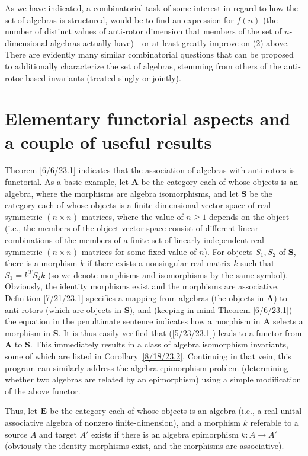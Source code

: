 \documentclass{amsart}
\numberwithin{equation}{section}
\theoremstyle{definition}
\numberwithin{theorem}{section}
\begin{document}
  \medskip
  
As we have indicated, a combinatorial task of some interest in regard to how the set of algebras is structured, would be to find an expression for $f(n)$ (the number of distinct values of anti-rotor dimension that members of the set of $n$-dimensional algebras actually have) - or at least greatly improve on (2) above.   
There are evidently many similar combinatorial questions that can be proposed to additionally characterize the set of algebras, stemming from others of the anti-rotor based invariants (treated singly or jointly).

\section{Elementary functorial aspects and a couple of useful results}
 Theorem \ref{6/6/23.1} indicates that the association of algebras with anti-rotors is functorial.  As a basic example, let {\bf A} be the category each of whose objects is an algebra, where the morphisms are algebra isomorphisms, and let {\bf S} be the category each of whose objects is a finite-dimensional vector space of real symmetric $(n\times n)$-matrices, where the value of $n\ge 1$ depends on the object (i.e., the members of the object vector space consist of different linear combinations of the members of a finite set of linearly independent real symmetric $(n\times n)$-matrices for some fixed value of $n$).  For objects $S_1,S_2$ of {\bf S}, there is a morphism $k$ if there exists a nonsingular real matrix $k$ such that \mbox{$S_1  = k^T  S_2 k$} (so we denote morphisms and isomorphisms by the same symbol).  Obviously, the identity morphisms exist and the morphisms are associative.    Definition \ref{7/21/23.1} specifies a mapping from algebras (the objects in {\bf A}) to anti-rotors (which are objects in {\bf S}), and (keeping in mind Theorem \ref{6/6/23.1}) the equation in the penultimate sentence indicates how a morphism in {\bf A} selects a morphism in {\bf S}.  It is thus easily verified that (\ref{5/23/23.1}) leads to a functor from {\bf A} to {\bf S}.  This immediately results in a class of algebra isomorphism invariants, some of which are listed in  \mbox{Corollary \ref{8/18/23.2}}.
Continuing in that vein, this program can similarly address the algebra epimorphism problem (determining whether two algebras are related by an epimorphism) using a simple modification of the above functor.  

Thus, let ${\bf E}$ be the category each of whose objects is an algebra (i.e., a real unital associative algebra of nonzero finite-dimension), and a morphism $k$ referable to a source $A$ and target $A'$ exists if there is an algebra epimorphism  $k:A\rightarrow A'$ (obviously the identity morphisms exist, and the morphisms are associative).    
\end{document}
